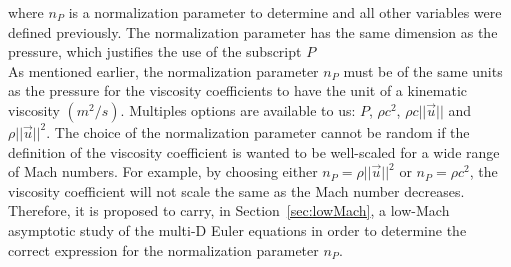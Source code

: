 \documentclass[preprint,10pt]{elsarticle}
\newcommand{\sct}[1]{Section~\ref{#1}}                   %
\begin{document}
where $n_P$ is a normalization parameter to determine and all other variables were defined previously. The normalization parameter has the same dimension as the pressure, which justifies the use of the subscript $P$\\
As mentioned earlier, the normalization parameter $n_P$ must be of the same units as the pressure for the viscosity coefficients to have the unit of a kinematic viscosity $(m^2 / s)$. Multiples options are available to us: $P$, $\rho c^2$, $\rho c || \vec{u} ||$ and $\rho || \vec{u} ||^2$. The choice of the normalization parameter cannot be random if the definition of the viscosity coefficient is wanted to be well-scaled for a wide range of Mach numbers. For example, by choosing either $n_P = \rho || \vec{u} ||^2$ or $n_P = \rho c^2$, the viscosity coefficient will not scale the same as the Mach number decreases. Therefore, it is proposed to carry, in \sct{sec:lowMach}, a low-Mach asymptotic study of the multi-D Euler equations in order to determine the correct expression for the normalization parameter $n_P$.
\end{document}
